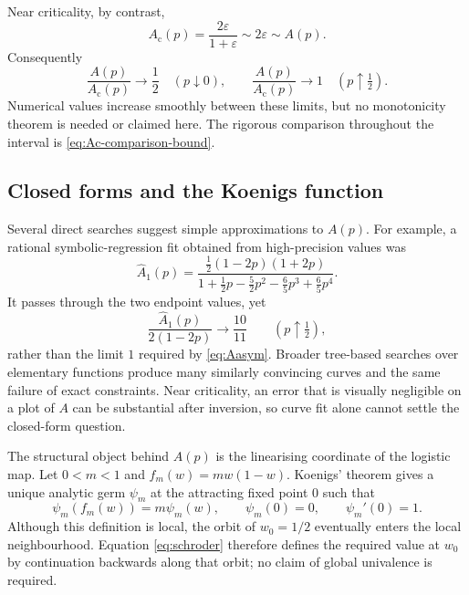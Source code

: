 Near criticality, by contrast,
\[
  A_{\mathrm c}(p)
  =\frac{2\varepsilon}{1+\varepsilon}
  \sim2\varepsilon
  \sim A(p).
\]
Consequently
\begin{equation}
  \frac{A(p)}{A_{\mathrm c}(p)}\longrightarrow\frac12
  \quad(p\downarrow0),
  \qquad
  \frac{A(p)}{A_{\mathrm c}(p)}\longrightarrow1
  \quad(p\uparrow\tfrac12).
  \label{eq:ratiolimits}
\end{equation}
Numerical values increase smoothly between these limits, but no monotonicity
theorem is needed or claimed here.  The rigorous comparison throughout the
interval is \eqref{eq:Ac-comparison-bound}.

\subsection{Closed forms and the Koenigs function}
\label{sec:koenigs}

Several direct searches suggest simple approximations to \(A(p)\).  For example,
a rational symbolic-regression fit obtained from high-precision values was
\begin{equation}
  \widehat A_1(p)=
  \frac{\tfrac12(1-2p)(1+2p)}
  {1+\tfrac12p-\tfrac52p^2-\tfrac65p^3+\tfrac65p^4}.
  \label{eq:A1hat}
\end{equation}
It passes through the two endpoint values, yet
\[
  \frac{\widehat A_1(p)}{2(1-2p)}
  \longrightarrow \frac{10}{11}
  \qquad (p\uparrow\tfrac12),
\]
rather than the limit \(1\) required by \eqref{eq:Aasym}.  Broader tree-based
searches over elementary functions produce many similarly convincing curves
and the same failure of exact constraints.  Near criticality, an error that is
visually negligible on a plot of \(A\) can be substantial after inversion, so
curve fit alone cannot settle the closed-form question.

The structural object behind \(A(p)\) is the linearising coordinate of the
logistic map.  Let \(0<m<1\) and \(f_m(w)=mw(1-w)\).  Koenigs' theorem
\cite{Koenigs1884} gives a unique analytic germ \(\psi_m\) at the attracting
fixed point \(0\) such that
\begin{equation}
  \psi_m(f_m(w))=m\psi_m(w),
  \qquad
  \psi_m(0)=0,
  \qquad
  \psi_m'(0)=1.
  \label{eq:schroder}
\end{equation}
Although this definition is local, the orbit of \(w_0=1/2\) eventually enters
the local neighbourhood.  Equation \eqref{eq:schroder} therefore defines the
required value at \(w_0\) by continuation backwards along that orbit; no claim of
global univalence is required.

